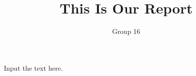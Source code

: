 \documentclass[12pt]{article}
\title{This Is Our Report}
\author{Group 16}
\begin{document}
\maketitle

Input the text here.
\end{document}
